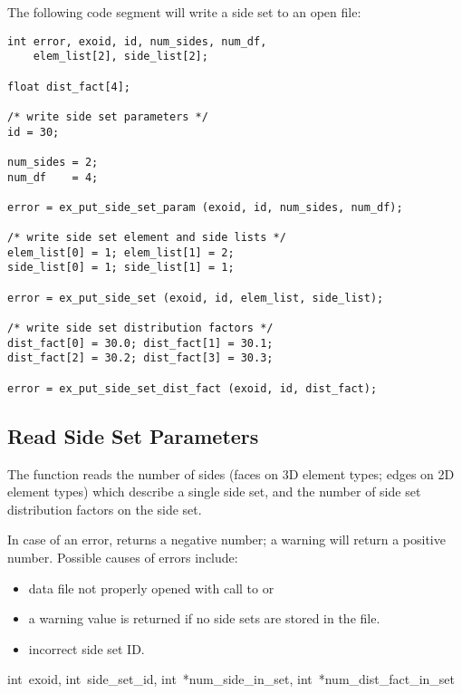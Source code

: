 The following code segment will write a side set to an open
\exo{} file:

\begin{lstlisting}
int error, exoid, id, num_sides, num_df,
    elem_list[2], side_list[2];

float dist_fact[4];

/* write side set parameters */
id = 30;

num_sides = 2;
num_df    = 4;

error = ex_put_side_set_param (exoid, id, num_sides, num_df);

/* write side set element and side lists */
elem_list[0] = 1; elem_list[1] = 2;
side_list[0] = 1; side_list[1] = 1;

error = ex_put_side_set (exoid, id, elem_list, side_list);

/* write side set distribution factors */
dist_fact[0] = 30.0; dist_fact[1] = 30.1;
dist_fact[2] = 30.2; dist_fact[3] = 30.3;

error = ex_put_side_set_dist_fact (exoid, id, dist_fact);
\end{lstlisting}



\subsection{Read Side Set Parameters}

The function  reads the number of
sides (faces on 3D element types; edges on 2D element types) which
describe a single side set, and the number of side set distribution
factors on the side set.

In case of an error,  returns a
negative number; a warning will return a positive number. Possible
causes of errors include:

\begin{itemize}
 \item data file not properly opened with call to 
 or 

 \item a warning value is returned if no side sets are stored
in the file.

 \item incorrect side set ID.
\end{itemize}

{int~exoid,
int~side_set_id,
int~*num_side_in_set,
int~*num_dist_fact_in_set}

